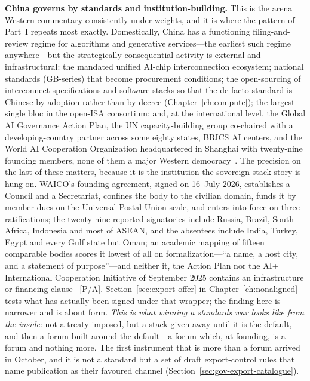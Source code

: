 \textbf{China governs by standards and institution-building.} This is the arena Western commentary consistently under-weights, and it is where the pattern of Part~I repeats most exactly. Domestically, China has a functioning filing-and-review regime for algorithms and generative services---the earliest such regime anywhere---but the strategically consequential activity is external and infrastructural: the mandated unified AI-chip interconnection ecosystem; national standards (GB-series) that become procurement conditions; the open-sourcing of interconnect specifications and software stacks so that the de facto standard is Chinese by adoption rather than by decree (Chapter~\ref{ch:compute}); the largest single bloc in the open-ISA consortium; and, at the international level, the Global AI Governance Action Plan, the UN capacity-building group co-chaired with a developing-country partner across some eighty states, BRICS AI centers, and the World AI Cooperation Organization headquartered in Shanghai with twenty-nine founding members, none of them a major Western democracy~\cite{action-plan,carnegie-pivot,waico}. The precision on the last of these matters, because it is the institution the sovereign-stack story is hung on. WAICO's founding agreement, signed on 16~July 2026, establishes a Council and a Secretariat, confines the body to the civilian domain, funds it by member dues on the Universal Postal Union scale, and enters into force on three ratifications; the twenty-nine reported signatories include Russia, Brazil, South Africa, Indonesia and most of ASEAN, and the absentees include India, Turkey, Egypt and every Gulf state but Oman; an academic mapping of fifteen comparable bodies scores it lowest of all on formalization---``a name, a host city, and a statement of purpose''---and neither it, the Action Plan nor the AI+ International Cooperation Initiative of September 2025 contains an infrastructure or financing clause~\cite{waico} [P/A]. Section~\ref{sec:export-offer} in Chapter~\ref{ch:nonaligned} tests what has actually been signed under that wrapper; the finding here is narrower and is about form. \emph{This is what winning a standards war looks like from the inside}: not a treaty imposed, but a stack given away until it is the default, and then a forum built around the default---a forum which, at founding, is a forum and nothing more. The first instrument that is more than a forum arrived in October, and it is not a standard but a set of draft export-control rules that name publication as their favoured channel (Section~\ref{sec:gov-export-catalogue}).

